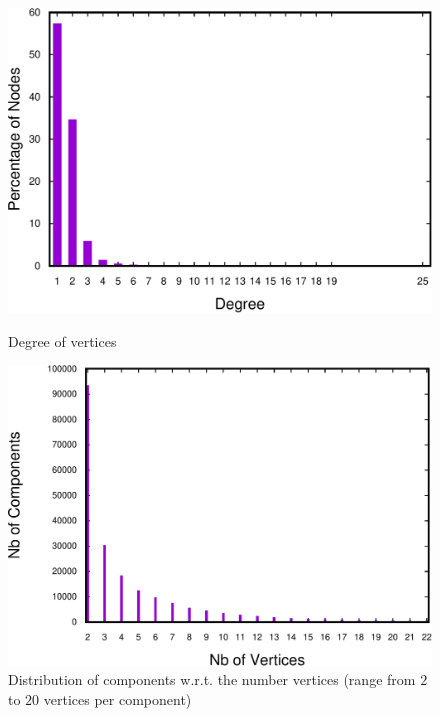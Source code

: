 \begin{figure}[!tbp]
  \centering
     {\includegraphics[scale=0.35]{bench/degree-counter-crop.pdf}}
  \caption{Degree of vertices}
    \label{fig:degree-vertices}
\end{figure}

\begin{figure}
\centering
\includegraphics[scale=0.35]{bench/frequency20-crop.pdf}
\caption{Distribution of components w.r.t. the number vertices (range from $2$ to $20$ vertices per component)}
\label{fig:vertices-components-20}
\end{figure}

